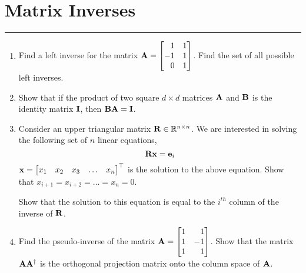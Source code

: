 \documentclass[
10pt, %
a4paper, %
oneside, %
headinclude,footinclude, %
BCOR5mm, %
]{scrartcl}
\def\mf{\ensuremath\mathbf}
\def\mb{\ensuremath\mathbb}
\def\bmx{\ensuremath\begin{bmatrix*}[r]}
\def\emx{\ensuremath\end{bmatrix*}}
\def\bmxc{\ensuremath\begin{bmatrix*}[c]}
\begin{document}
\newpage
\section{Matrix Inverses}
\hrule
\vspace{0.5cm}

\begin{enumerate}
	\item Find a left inverse for the matrix $\mf{A} = \bmx 1 & 1 \\ -1 & 1 \\ 0 & 1\emx$. Find the set of all possible left inverses. 
	
	\item Show that if the product of two square $d \times d$ matrices $\mf{A}$ and $\mf{B}$ is the identity matrix $\mf{I}$, then $\mf{B}\mf{A} = \mf{I}$.
	
	\item Consider an upper triangular matrix $\mf{R} \in \mb{R}^{n \times n}$. We are interested in solving the following set of $n$ linear equations,
	\[ \mf{R} \mf{x} = \mf{e}_i \]
	$\mf{x} = \bmxc x_1 & x_2 & x_3 & \ldots & x_n \emx^\top$ is the solution to the above equation. Show that $x_{i+1} = x_{i+2} = \ldots = x_n = 0$.

	Show that the solution to this equation is equal to the $i^{th}$ column of the inverse of $\mf{R}$.

	\item Find the pseudo-inverse of the matrix $\mf{A} = \bmx 1 & 1 \\ 1 & -1 \\ 1 & 1 \emx$. Show that the matrix $\mf{A}\mf{A}^\dagger$ is the orthogonal projection matrix onto the column space of $\mf{A}$.
\end{enumerate}
\end{document}
